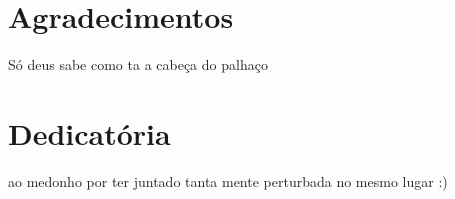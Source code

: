 \chapter*{Agradecimentos}
Só deus sabe como ta a cabeça do palhaço

\chapter*{Dedicatória}
ao medonho por ter juntado tanta mente perturbada no mesmo lugar :)

\newpage